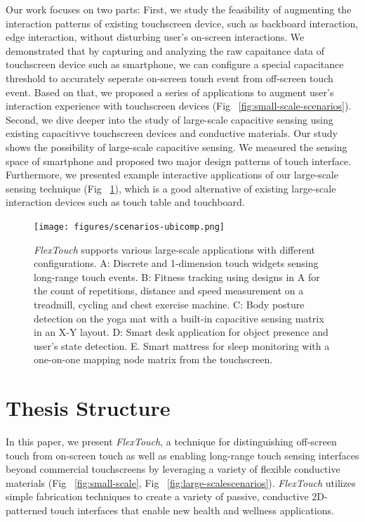 Our work focuses on two parts: First, we study the feasibility of augmenting the interaction patterns of existing touchscreen device, such as backboard interaction, edge interaction, without disturbing user's on-screen interactions. We demonstrated that by capturing and analyzing the raw capaitance data of touchscreen device such as smartphone, we can configure a special capacitance threshold to accurately seperate on-screen touch event from off-screen touch event. Based on that, we proposed a series of applications to augment user's interaction experience with touchscreen devices (Fig ~\ref{fig:small-scale-scenarios}). Second, we dive deeper into the study of large-scale capacitive sensing using existing capacitivve touchscreen devices and conductive materials. Our study shows the possibility of large-scale capacitive sensing. We measured the sensing space of smartphone and proposed two major design patterns of touch interface. Furthermore, we presented example interactive applications of our large-scale sensing technique (Fig ~\ref{fig:large-scale-scenarios}), which is a good alternative of existing large-scale interaction devices such as touch table and touchboard.


\begin{figure}
\centering
  \texttt{[image: figures/scenarios-ubicomp.png]}
  \setlength{\belowcaptionskip}{-8pt}
  \caption{\textit{FlexTouch} supports various large-scale applications with different configurations. A: Discrete and 1-dimension touch widgets sensing long-range touch events. B: Fitness tracking using designs in A for the count of repetitions, distance and speed measurement on a treadmill, cycling and chest exercise machine. C: Body posture detection on the yoga mat with a built-in capacitive sensing matrix in an X-Y layout. D: Smart desk application for object presence and user's state detection. E. Smart mattress for sleep monitoring with a one-on-one mapping node matrix from the touchscreen.}
  \label{fig:large-scale-scenarios}
  
\end{figure}
\section{Thesis Structure}
In this paper, we present \textit{FlexTouch}, a technique for distinguishing off-screen touch from on-screen touch as well as enabling long-range touch sensing interfaces beyond commercial touchscreens by leveraging a variety of flexible conductive materials (Fig ~\ref{fig:small-scale}, Fig ~\ref{fig:large-scalescenarios}). \textit{FlexTouch} utilizes simple fabrication techniques to create a variety of passive, conductive 2D-patterned touch interfaces that enable new health and wellness applications. 

